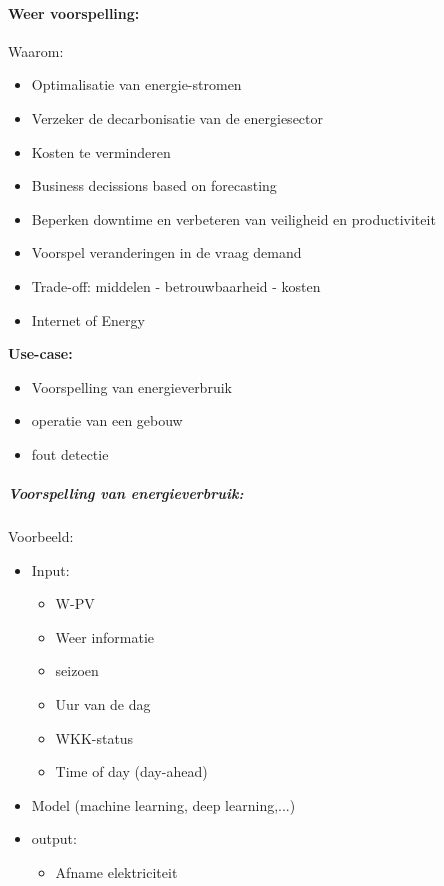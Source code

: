 \documentclass[12pt]{article}
\begin{document}
\paragraph{Weer voorspelling:}
Waarom:\begin{itemize}
    \item Optimalisatie van energie-stromen 
    \item Verzeker de decarbonisatie van de energiesector 
    \item Kosten te verminderen 
    \item Business decissions based on forecasting 
    \item Beperken downtime en verbeteren van veiligheid en productiviteit 
    \item Voorspel veranderingen in de vraag demand 
    \item Trade-off: middelen - betrouwbaarheid - kosten 
    \item Internet of Energy 
\end{itemize}
\textbf{Use-case:}\begin{itemize}
    \item Voorspelling van energieverbruik 
    \item operatie van een gebouw 
    \item fout detectie 
\end{itemize}
\subparagraph{Voorspelling van energieverbruik:}
Voorbeeld:\begin{itemize}
    \item Input:\begin{itemize}
        \item W-PV 
        \item Weer informatie 
        \item seizoen 
        \item Uur van de dag 
        \item WKK-status 
        \item Time of day (day-ahead)
    \end{itemize}
    \item Model (machine learning, deep learning,...)
    \item output:\begin{itemize}
        \item Afname elektriciteit
    \end{itemize}
\end{itemize}
\end{document}
